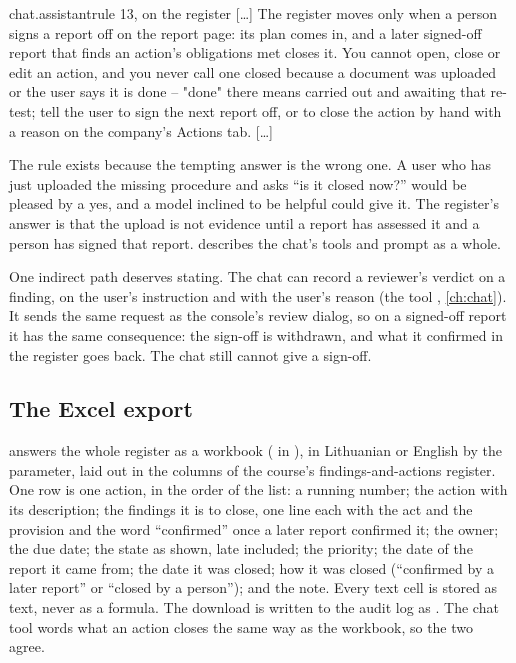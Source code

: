 \begin{promptexcerpt}{chat.assistant}{rule 13, on the register}
[…]
The register moves only when a person signs a report off on the report page: its plan comes in, and a later signed-off report that finds an action's obligations met closes it. You cannot open, close or edit an action, and you never call one closed because a document was uploaded or the user says it is done – "done" there means carried out and awaiting that re-test; tell the user to sign the next report off, or to close the action by hand with a reason on the company's Actions tab.
[…]
\end{promptexcerpt}

The rule exists because the tempting answer is the wrong one. A user who has just uploaded
the missing procedure and asks \enquote{is it closed now?} would be pleased by a yes, and a
model inclined to be helpful could give it. The register's answer is that the upload is not
evidence until a report has assessed it and a person has signed that report. 
describes the chat's tools and prompt as a whole.

One indirect path deserves stating. The chat can record a reviewer's verdict on a finding, on
the user's instruction and with the user's reason (the tool ,
\cref{ch:chat}). It sends the same request as the console's review dialog, so on a signed-off
report it has the same consequence: the sign-off is withdrawn, and what it confirmed in the
register goes back. The chat still cannot give a sign-off.

\subsection{The Excel export}

 answers the whole register as a workbook
( in ), in Lithuanian or English by the
 parameter, laid out in the columns of the course's findings-and-actions
register. One row is one action, in the order of the list: a running number; the action with
its description; the findings it is to close, one line each with the act and the provision
and the word \enquote{confirmed} once a later report confirmed it; the owner; the due date;
the state as shown, late included; the priority; the date of the report it came from; the
date it was closed; how it was closed (\enquote{confirmed by a later report} or
\enquote{closed by a person}); and the note. Every text cell is stored as text, never as a
formula. The download is written to the audit log as . The chat tool
words what an action closes the same way as the workbook, so the two agree.


